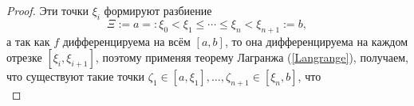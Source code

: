 \begin{proof}
Эти точки $\xi_i$ формируют разбиение 
\[
\Xi:=a=:\xi_0 < \xi_1 \le \cdots \le \xi_n < \xi_{n+1}:=b,
\]
а так как $f$ дифференцируема на всём $[a,b]$, то она дифференцируема на каждом отрезке $[\xi_i,\xi_{i+1}]$, поэтому применяя теорему Лагранжа (\ref{Langrange}), получаем, что существуют такие точки $\zeta_1 \in [a,\xi_1], \ldots, \zeta_{n+1} \in [\xi_n, b]$, что
\[
 
\]


\end{proof}

